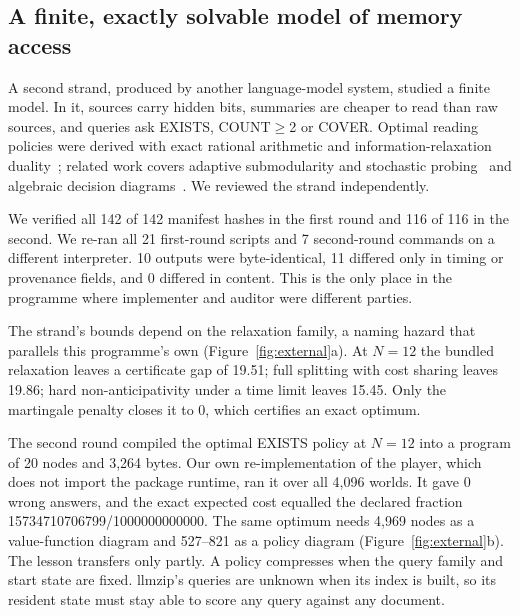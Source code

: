 \documentclass[11pt,a4paper]{article}
\begin{document}
\subsection{A finite, exactly solvable model of memory access}\label{sec:codex}
A second strand, produced by another language-model system, studied a finite model. In it, sources carry hidden bits, summaries are cheaper to read than raw sources, and queries ask EXISTS, COUNT$\ge$2 or COVER. Optimal reading policies were derived with exact rational arithmetic and information-relaxation duality~\citep{brown2010information}; related work covers adaptive submodularity and stochastic probing~\citep{golovin2010adaptive,deshpande2013sbfe} and algebraic decision diagrams~\citep{hoey2013spudd}. We reviewed the strand independently.

We verified all 142 of 142 manifest hashes in the first round and 116 of 116 in the second. We re-ran all 21 first-round scripts and 7 second-round commands on a different interpreter. 10 outputs were byte-identical, 11 differed only in timing or provenance fields, and 0 differed in content. This is the only place in the programme where implementer and auditor were different parties.

The strand's bounds depend on the relaxation family, a naming hazard that parallels this programme's own (Figure~\ref{fig:external}a). At $N=12$ the bundled relaxation leaves a certificate gap of 19.51; full splitting with cost sharing leaves 19.86; hard non-anticipativity under a time limit leaves 15.45. Only the martingale penalty closes it to 0, which certifies an exact optimum.

The second round compiled the optimal EXISTS policy at $N=12$ into a program of 20 nodes and 3{,}264 bytes. Our own re-implementation of the player, which does not import the package runtime, ran it over all 4{,}096 worlds. It gave 0 wrong answers, and the exact expected cost equalled the declared fraction 15734710706799/1000000000000. The same optimum needs 4{,}969 nodes as a value-function diagram and 527--821 as a policy diagram (Figure~\ref{fig:external}b). The lesson transfers only partly. A policy compresses when the query family and start state are fixed. llmzip's queries are unknown when its index is built, so its resident state must stay able to score any query against any document.
\end{document}
